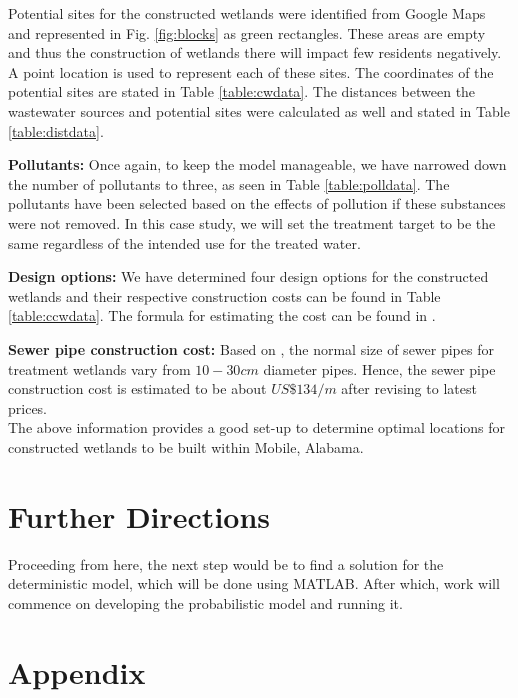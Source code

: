 \documentclass[preprint,12pt,authoryear]{elsarticle}
\begin{document}
Potential sites for the constructed wetlands were identified from Google Maps and represented in Fig. \ref{fig:blocks} as green rectangles. These areas are empty and thus the construction of wetlands there will impact few residents negatively. A point location is used to represent each of these sites. The coordinates of the potential sites are stated in Table \ref{table:cwdata}. The distances between the wastewater sources and potential sites were calculated as well and stated in Table \ref{table:distdata}. 

\textbf{Pollutants:} Once again, to keep the model manageable, we have narrowed down the number of pollutants to three, as seen in Table \ref{table:polldata}. The pollutants have been selected based on the effects of pollution if these substances were not removed. In this case study, we will set the treatment target to be the same regardless of the intended use for the treated water.

\textbf{Design options:} We have determined four design options for the constructed wetlands and their respective construction costs can be found in Table \ref{table:ccwdata}. The formula for estimating the cost can be found in \cite{kadlec2009}.

\textbf{Sewer pipe construction cost:} Based on \cite{kadlec2009}, the normal size of sewer pipes for treatment wetlands vary from $10-30 cm$ diameter pipes. Hence, the sewer pipe construction cost is estimated to be about $US\$134/m$ \citep{usepa2000} after revising to latest prices. \\

The above information provides a good set-up to determine optimal locations for constructed wetlands to be built within Mobile, Alabama. 

\section{Further Directions}
Proceeding from here, the next step would be to find a solution for the deterministic model, which will be done using MATLAB. After which, work will commence on developing the probabilistic model and running it. 


\newpage
\section*{Appendix}\label{Chap:appendix}
\end{document}
